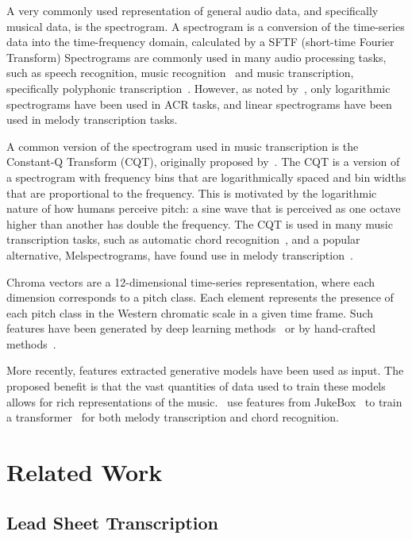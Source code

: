 A very commonly used representation of general audio data, and specifically musical data, is the spectrogram. A spectrogram is a conversion of the time-series data into the time-frequency domain, calculated by a SFTF (short-time Fourier Transform) Spectrograms are commonly used in many audio processing tasks, such as speech recognition, music recognition~\citep{ShazamSpectrogram} and music transcription, specifically polyphonic transcription~\citep{PianoTranscriptionWithTransformer}. However, as noted by~\citet{20YearsofACR}, only logarithmic spectrograms have been used in ACR tasks, and linear spectrograms have been used in melody transcription tasks.

A common version of the spectrogram used in music transcription is the Constant-Q Transform (CQT), originally proposed by~\citet{CQT}. The CQT is a version of a spectrogram with frequency bins that are logarithmically spaced and bin widths that are proportional to the frequency. This is motivated by the logarithmic nature of how humans perceive pitch: a sine wave that is perceived as one octave higher than another has double the frequency. The CQT is used in many music transcription tasks, such as automatic chord recognition~\citep{FirstDeepLearningCQT}, and a popular alternative, Melspectrograms, have found use in melody transcription~\citep{PianoTranscriptionWithTransformer}. 

Chroma vectors are a 12-dimensional time-series representation, where each dimension corresponds to a pitch class. Each element represents the presence of each pitch class in the Western chromatic scale in a given time frame. Such features have been generated by deep learning methods~\citep{BalanceRandomForestACR} or by hand-crafted methods~\citep{NNLSChroma}.

More recently, features extracted generative models have been used as input. The proposed benefit is that the vast quantities of data used to train these models allows for rich representations of the music.~\citet{MelodyTranscriptionViaGenerativePreTraining} use features from JukeBox~\citep{Jukebox} to train a transformer~\citep{AttentionIsAllYouNeed} for both melody transcription and chord recognition.

\section{Related Work}

\subsection{Lead Sheet Transcription}

